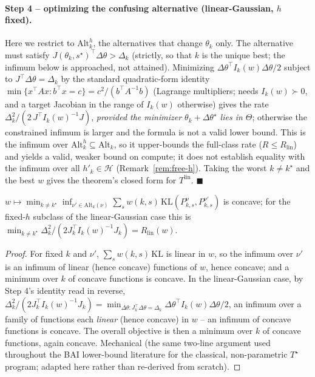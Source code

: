 \paragraph{Step 4 -- optimizing the confusing alternative (linear-Gaussian, $h$ fixed).}
Here we restrict to $\mathrm{Alt}^h_k$, the alternatives that change $\theta_k$ only. The
alternative must satisfy $J(\theta_k,s^\star)^\top \Delta\theta > \Delta_k$ (strictly,
so that $k$ is the unique best; the infimum below is approached, not attained). Minimizing
$\Delta\theta^\top I_k(w) \Delta\theta / 2$ subject to $J^\top \Delta\theta = \Delta_k$ by
the standard quadratic-form identity $\min\{x^\top A x : b^\top x = c\} = c^2 /
(b^\top A^{-1} b)$ (Lagrange multipliers; needs $I_k(w) \succ 0$, and a
target Jacobian in the range of $I_k(w)$ otherwise) gives the rate
$\Delta_k^2 / (2\, J^\top I_k(w)^{-1} J)$, \emph{provided the minimizer
$\theta_k + \Delta\theta^\star$ lies in $\Theta$}; otherwise the constrained infimum is
larger and the formula is not a valid lower bound. This is the infimum over
$\mathrm{Alt}^h_k \subseteq \mathrm{Alt}_k$, so it upper-bounds the full-class rate
($R \le R_{\mathrm{lin}}$) and yields a valid, weaker bound on compute; it does not
establish equality with the infimum over all $h'_k \in \mathcal{H}$
(Remark~\ref{rem:free-h}). Taking the worst $k \ne k^\star$ and the best $w$ gives the
theorem's closed form for $T^{\mathrm{lin}}$. $\blacksquare$

\begin{lemma}
\label{lem:concave}
$w \mapsto \min_{k \ne k^\star} \inf_{\nu' \in \mathrm{Alt}_k(\nu)} \sum_s w(k,s)\,
\mathrm{KL}(P^\nu_{k,s}, P^{\nu'}_{k,s})$ is concave; for the fixed-$h$ subclass of the
linear-Gaussian case this is $\min_{k \ne k^\star} \Delta_k^2 / (2 J_k^\top I_k(w)^{-1}
J_k) = R_{\mathrm{lin}}(w)$.
\end{lemma}
\begin{proof}
For fixed $k$ and $\nu'$, $\sum_s w(k,s)\,\mathrm{KL}$ is linear in $w$, so the infimum
over $\nu'$ is an infimum of linear (hence concave) functions of $w$, hence concave; and a
minimum over $k$ of concave functions is concave. In the linear-Gaussian case, by Step 4's
identity read in reverse,
$\Delta_k^2 / (2J_k^\top I_k(w)^{-1} J_k) = \min_{\Delta\theta : J_k^\top \Delta\theta =
\Delta_k} \Delta\theta^\top I_k(w) \Delta\theta / 2$, an infimum over a family of
functions each \emph{linear} (hence concave) in $w$ -- an infimum of concave functions
is concave. The overall objective is then a minimum over $k$ of concave functions,
again concave. Mechanical (the same two-line argument used throughout the BAI lower-bound
literature for the classical, non-parametric $T^\star$ program; adapted here rather than
re-derived from scratch).
\end{proof}

